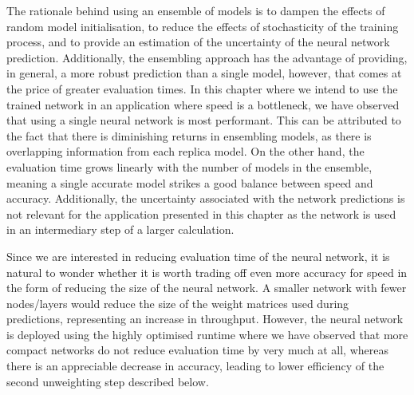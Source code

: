 \documentclass[main.tex]{subfiles}
\begin{document}
The rationale behind using an ensemble of models is to dampen the
effects of random model initialisation, to reduce the effects of
stochasticity of the training process, and to provide an estimation
of the uncertainty of the neural network prediction. Additionally, the ensembling
approach has the advantage of providing, in general, a more robust
prediction than a single model, however, that comes at the price
of greater evaluation times. In this chapter where we intend to use the
trained network in an application where speed is a bottleneck, we
have observed that using a single neural network is most performant.
This can be attributed to the fact that there is diminishing returns
in ensembling models, as there is overlapping information from each
replica model. On the other hand, the evaluation time grows linearly
with the number of models in the ensemble, meaning a single
accurate model strikes a good balance between speed and accuracy.
Additionally, the uncertainty associated with the network predictions
is not relevant for the application presented in this chapter as the
network is used in an intermediary step of a larger calculation.

Since we are interested in reducing evaluation time of the neural
network, it is natural to wonder whether it is worth trading
off even more accuracy for speed in the form of reducing the size of the
neural network. A smaller network with fewer nodes/layers would reduce
the size of the weight matrices used during predictions, representing an
increase in throughput.
However, the neural network is deployed using the highly optimised
{\ONNX} runtime where we have observed that more compact networks
do not reduce evaluation time by very much at all, whereas there
is an appreciable decrease in accuracy, leading to lower efficiency
of the second unweighting step described below.
\end{document}
